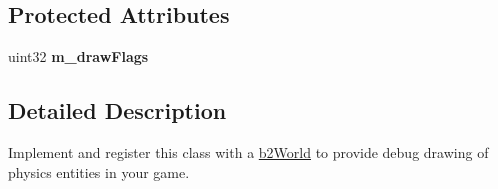 \subsection*{Protected Attributes}
\begin{DoxyCompactItemize}
\item 
\hypertarget{classb2_draw_adfcd2e54ddaec6f0a111ec1a1cf8b9a0}{uint32 {\bfseries m\-\_\-draw\-Flags}}\label{classb2_draw_adfcd2e54ddaec6f0a111ec1a1cf8b9a0}

\end{DoxyCompactItemize}


\subsection{Detailed Description}
Implement and register this class with a \hyperlink{classb2_world}{b2\-World} to provide debug drawing of physics entities in your game. 

